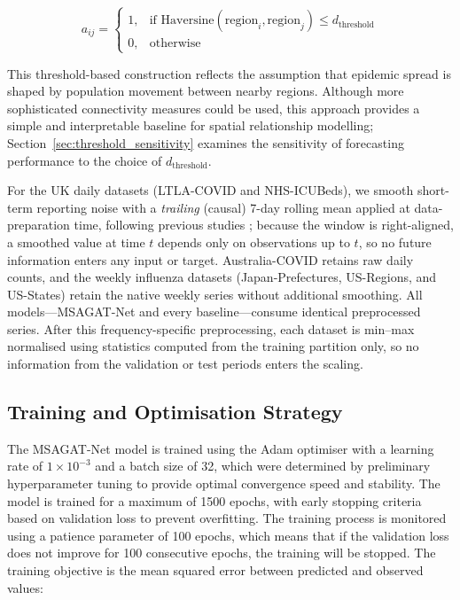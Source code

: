 \documentclass[final,1p,times]{elsarticle}
\begin{document}
\begin{equation}
a_{ij} = 
\begin{cases}
1, & \text{if } \text{Haversine}(\text{region}_i, \text{region}_j) \leq d_{\text{threshold}} \\
0, & \text{otherwise}
\end{cases}
\end{equation}

This threshold-based construction reflects the assumption that epidemic spread is shaped by population movement between nearby regions. Although more sophisticated connectivity measures could be used, this approach provides a simple and interpretable baseline for spatial relationship modelling; Section~\ref{sec:threshold_sensitivity} examines the sensitivity of forecasting performance to the choice of $d_{\text{threshold}}$.

For the UK daily datasets (LTLA-COVID and NHS-ICUBeds), we smooth short-term reporting noise with a \emph{trailing} (causal) 7-day rolling mean applied at data-preparation time, following previous studies \cite{ajao2023deep, oluwasakin2023data, zeroual2020deep, Kamalov2022ReviewDL}; because the window is right-aligned, a smoothed value at time $t$ depends only on observations up to $t$, so no future information enters any input or target. Australia-COVID retains raw daily counts, and the weekly influenza datasets (Japan-Prefectures, US-Regions, and US-States) retain the native weekly series without additional smoothing. All models---MSAGAT-Net and every baseline---consume identical preprocessed series. After this frequency-specific preprocessing, each dataset is min--max normalised using statistics computed from the training partition only, so no information from the validation or test periods enters the scaling.

\subsection{Training and Optimisation Strategy}
\label{sec:optimisation}

The MSAGAT-Net model is trained using the Adam optimiser with a learning rate of $1 \times 10^{-3}$ and a batch size of 32, which were determined by preliminary hyperparameter tuning to provide optimal convergence speed and stability. The model is trained for a maximum of 1500 epochs, with early stopping criteria based on validation loss to prevent overfitting. The training process is monitored using a patience parameter of 100 epochs, which means that if the validation loss does not improve for 100 consecutive epochs, the training will be stopped. The training objective is the mean squared error between predicted and observed values:
\end{document}

